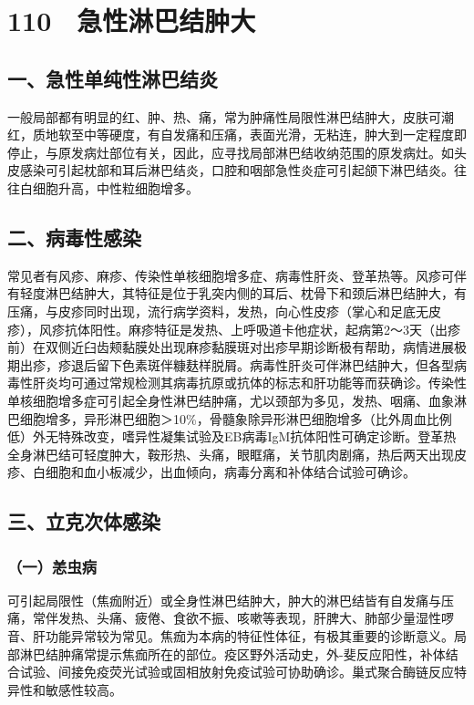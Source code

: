 \protect\hypertarget{text00253.html}{}{}

\section{110　急性淋巴结肿大}

\subsection{一、急性单纯性淋巴结炎}

一般局部都有明显的红、肿、热、痛，常为肿痛性局限性淋巴结肿大，皮肤可潮红，质地软至中等硬度，有自发痛和压痛，表面光滑，无粘连，肿大到一定程度即停止，与原发病灶部位有关，因此，应寻找局部淋巴结收纳范围的原发病灶。如头皮感染可引起枕部和耳后淋巴结炎，口腔和咽部急性炎症可引起颌下淋巴结炎。往往白细胞升高，中性粒细胞增多。

\subsection{二、病毒性感染}

常见者有风疹、麻疹、传染性单核细胞增多症、病毒性肝炎、登革热等。风疹可伴有轻度淋巴结肿大，其特征是位于乳突内侧的耳后、枕骨下和颈后淋巴结肿大，有压痛，与皮疹同时出现，流行病学资料，发热，向心性皮疹（掌心和足底无皮疹），风疹抗体阳性。麻疹特征是发热、上呼吸道卡他症状，起病第2～3天（出疹前）在双侧近臼齿颊黏膜处出现麻疹黏膜斑对出疹早期诊断极有帮助，病情进展极期出疹，疹退后留下色素斑伴糠麸样脱屑。病毒性肝炎可伴淋巴结肿大，但各型病毒性肝炎均可通过常规检测其病毒抗原或抗体的标志和肝功能等而获确诊。传染性单核细胞增多症可引起全身性淋巴结肿痛，尤以颈部为多见，发热、咽痛、血象淋巴细胞增多，异形淋巴细胞＞10\%，骨髓象除异形淋巴细胞增多（比外周血比例低）外无特殊改变，嗜异性凝集试验及EB病毒IgM抗体阳性可确定诊断。登革热全身淋巴结可轻度肿大，鞍形热、头痛，眼眶痛，关节肌肉剧痛，热后两天出现皮疹、白细胞和血小板减少，出血倾向，病毒分离和补体结合试验可确诊。

\subsection{三、立克次体感染}

\subsubsection{（一）恙虫病}

可引起局限性（焦痂附近）或全身性淋巴结肿大，肿大的淋巴结皆有自发痛与压痛，常伴发热、头痛、疲倦、食欲不振、咳嗽等表现，肝脾大、肺部少量湿性啰音、肝功能异常较为常见。焦痂为本病的特征性体征，有极其重要的诊断意义。局部淋巴结肿痛常提示焦痂所在的部位。疫区野外活动史，外-斐反应阳性，补体结合试验、间接免疫荧光试验或固相放射免疫试验可协助确诊。巢式聚合酶链反应特异性和敏感性较高。

